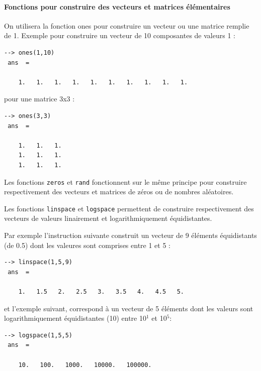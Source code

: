 \paragraph{Fonctions pour construire des vecteurs et matrices élémentaires}
On utilisera la fonction ones pour construire un vecteur ou une matrice remplie 
de 1.
Exemple pour construire un vecteur de 10 composantes de valeurs 1 :
\begin{code}
\begin{verbatim}
--> ones(1,10)
 ans  =

    1.   1.   1.   1.   1.   1.   1.   1.   1.   1.

\end{verbatim}
\end{code}
pour une matrice 3x3 :
\begin{code}
\begin{verbatim}
--> ones(3,3)
 ans  =

    1.   1.   1.
    1.   1.   1.
    1.   1.   1.
\end{verbatim}
\end{code}

Les fonctions \verb?zeros? et \verb?rand? fonctionnent sur le même principe 
pour construire respectivement des vecteurs et matrices de zéros ou de nombres aléatoires.

Les fonctions \verb?linspace? et \verb?logspace? permettent de construire respectivement 
des vecteurs de valeurs linairement et logarithmiquement équidistantes.  

Par exemple l'instruction suivante construit un vecteur de 9 éléments équidistants (de 0.5) 
dont les valeures sont comprises entre 1 et 5 :
\begin{code}
\begin{verbatim}
--> linspace(1,5,9)
 ans  =

    1.   1.5   2.   2.5   3.   3.5   4.   4.5   5.
\end{verbatim}
\end{code}
et l'exemple suivant, correspond à un vecteur de 5 éléments dont les valeurs sont logarithmiquement
équidistantes (10) entre 10$^1$ et 10$^5$:
\begin{code}
\begin{verbatim}
--> logspace(1,5,5)
 ans  =

    10.   100.   1000.   10000.   100000.

\end{verbatim}
\end{code}

